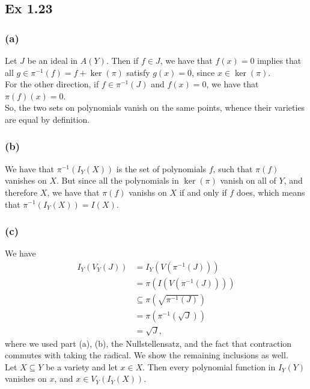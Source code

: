 \documentclass{article}
\theoremstyle{definition}
\begin{document}
\subsection*{Ex 1.23}
\subsubsection*{(a)}

Let $J$ be an ideal in $A(Y)$. Then if $f \in J$, we have that $f(x) = 0$
implies that all $g \in \pi^{-1}(f) = f + \ker(\pi)$ satisfy $g(x) = 0$, since
$x \in \ker(\pi)$. \\

For the other direction, if $f \in \pi^{-1}(J)$ and $f(x) = 0$, we have that 
$\pi(f)(x) = 0$. \\

So, the two sets on polynomials vanish on the same points, whence their
varieties are equal by definition. \\

\subsubsection*{(b)}

We have that $\pi^{-1}(I_Y(X))$ is the set of polynomials $f$, such that
$\pi(f)$ vanishes on $X$. But since all the polynomials in $\ker(\pi)$ vanish
on all of $Y$, and therefore $X$, we have that $\pi(f)$ vanishs on $X$ if and
only if $f$ does, which means that $\pi^{-1}(I_Y(X)) = I(X)$.

\subsubsection*{(c)}

We have 
\begin{align*}
	I_{Y}(V_{Y}(J))
	&=
	I_{Y}(V(\pi^{-1}(J))) \\
	&=
	\pi(I(V(\pi^{-1}(J)))) \\
	&\subseteq
	\pi(\sqrt{\pi^{-1}(J)}) \\
	&=
	\pi(\pi^{-1}(\sqrt{J})) \\
	&=
	\sqrt{J},
\end{align*}
where we used part (a), (b), the Nullstellensatz, and the fact that contraction
commutes with taking the radical. We show the remaining inclusions as well. \\

Let $X \subseteq Y$ be a variety and let $x \in X$. Then 
every polynomial function in $I_Y(Y)$ vanishes on $x$, and $x \in V_{Y}(I_{Y}(X))$. \\
\end{document}
